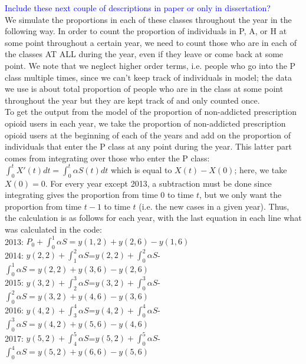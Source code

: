 \documentclass[12pt]{article}
\begin{document}
\textcolor{blue}{Include these next couple of descriptions in paper or only in dissertation?} \\
We simulate the proportions in each of these classes throughout the year in the following way. 
In order to count the proportion of individuals in P, A, or H at some point throughout a certain year, 
 we need to count those who are in each of the classes AT ALL during the year, even if they leave or come back at some point. We note that we neglect higher order terms, i.e. people who go into the P class multiple times, since we can't keep track of individuals in model; the data we use is about total proportion of people who are in the class at some point throughout the year but they are kept track of and only counted once. \\
  
To get the output from the model of the proportion of non-addicted prescription opioid users in each year, we take the proportion of non-addicted prescription opioid users at the beginning of each of the years and add on the proportion of individuals that enter the P class at any point during the year. This latter part comes from integrating over those who enter the P class: $\int_0^t X'(t)dt=\int_0^t \alpha S(t)dt$ which is equal to $X(t)-X(0)$; here, we take $X(0)=0.$ For every year except 2013, a subtraction must be done since integrating gives the proportion from time $0$ to time $t$, but we only want the proportion from time $t-1$ to time $t$ (i.e. the new cases in a given year). Thus, the calculation is as follows for each year, with the last equation in each line what was calculated in the code: \\
2013: $P_0 + \int_0^1 \alpha S = y(1,2)+y(2,6)-y(1,6)$ \\
2014: $y(2,2)+\int_1^2 \alpha S$=$y(2,2)+\int_0^2 \alpha S$- $\int_0^1 \alpha S=y(2,2)+y(3,6)-y(2,6)$ \\
2015: $y(3,2)+\int_2^3 \alpha S$=$y(3,2)+\int_0^3 \alpha S$- $\int_0^2 \alpha S=y(3,2)+y(4,6)-y(3,6)$ \\
2016: $y(4,2)+\int_3^4 \alpha S$=$y(4,2)+\int_0^4 \alpha S$- $\int_0^3 \alpha S=y(4,2)+y(5,6)-y(4,6)$ \\
2017: $y(5,2)+\int_4^5 \alpha S$=$y(5,2)+\int_0^5\alpha S$- $\int_0^4 \alpha S=y(5,2)+y(6,6)-y(5,6)$ \\
\end{document}
